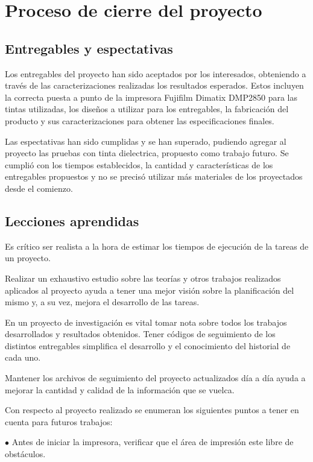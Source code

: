 \chapter{Proceso de cierre del proyecto}\label{chap:apendiceB}

\section{Entregables y espectativas}
Los entregables del proyecto han sido aceptados por los interesados, obteniendo a través de las caracterizaciones realizadas los resultados esperados. Estos incluyen la correcta puesta a punto de la impresora Fujifilm Dimatix DMP2850 para las tintas utilizadas, los diseños a utilizar para los entregables, la fabricación del producto y sus caracterizaciones para obtener las especificaciones finales.

Las espectativas han sido cumplidas y se han superado, pudiendo agregar al proyecto las pruebas con tinta dielectrica, propuesto como trabajo futuro. Se cumplió con los tiempos establecidos, la cantidad y características de los entregables propuestos y no se precisó utilizar más materiales de los proyectados desde el comienzo.

\section{Lecciones aprendidas}
Es crítico ser realista a la hora de estimar los tiempos de ejecución de la tareas de un proyecto.

Realizar un exhaustivo estudio sobre las teorías y otros trabajos realizados aplicados al proyecto ayuda a tener una mejor visión sobre la planificación del mismo y, a su vez, mejora el desarrollo de las tareas.

En un proyecto de investigación es vital tomar nota sobre todos los trabajos desarrollados y resultados obtenidos. Tener códigos de seguimiento de los distintos entregables simplifica el desarrollo y el conocimiento del historial de cada uno.

Mantener los archivos de seguimiento del proyecto actualizados día a día ayuda a mejorar la cantidad y calidad de la información que se vuelca.

Con respecto al proyecto realizado se enumeran los siguientes puntos a tener en cuenta para futuros trabajos:

$\bullet$ Antes de iniciar la impresora, verificar que el área de impresión este libre de obstáculos.

